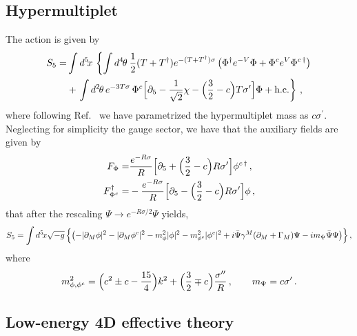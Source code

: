 \documentclass[a4paper,12pt]{article}
\begin{document}
\subsection{Hypermultiplet}

The action is given by
\begin{align}
    S_5 =& \int d^{5}\! x\, \left\{ \int d^4\mspace{-2mu}\theta \:
        \frac{1}{2} (T + T^{\dag} ) e^{-(T+ T^{\dag})\sigma}
        \,\bigl(\Phi^{\dag} e^{-V}\Phi + \Phi^{c} e^{V}\Phi^{c\,\dag}\bigr) \right.\nonumber\\
    & + \left.\int d^2\mspace{-2mu} \theta\, e^{-3 T \sigma}\, \Phi^c
        \Bigl[ \partial_{5} -\frac{1}{\sqrt{2}}\chi - \Bigl( \frac{3}{2}
        - c \Bigr) T\sigma^\prime \Bigr] \Phi + \text{h.c.}
    \right\}\, ,
\label{hyperw}
\end{align}
where following Ref.~\cite{gp} we have parametrized the hypermultiplet
mass as $c\sigma^\prime$.  
Neglecting for simplicity the gauge sector, 
we have that 
the  auxiliary fields are given by
\begin{align}
    F_{\Phi} = & \frac{e^{-R\sigma}}{R} \Bigl[\partial_{5} +
    \Bigl(\frac{3}{2} - c \Bigr)R \sigma' \Bigr] \phi^{c\, \dagger}
\, ,\nonumber\\
    F_{\Phi^c}^\dagger = & - \frac{e^{-R\sigma}}{R} \Bigl[\partial_{5} -
    \Bigl(\frac{3}{2} - c \Bigr)R \sigma' \Bigr] \phi\, ,
\end{align}
that after the rescaling $\Psi \rightarrow e^{-R\sigma/2} \Psi$ yields,
\begin{equation}
    S_5 = \int d^{5}\! x \sqrt{-g} \, \Bigl\{ \bigl( - |\partial_{M}
    \phi|^2 - |\partial_{M}  \phi^{c}|^2 - m_{\phi}^2 |\phi|^2 -
m_{\phi^c}^2     |\phi^{c}|^2  + i \bar{\Psi} \gamma^{M}(\partial_{M} +
    \Gamma_{M}) \Psi - i m_{\Psi} \bar{\Psi}\Psi \bigr)\Bigr\}\, ,
\end{equation}
where
\begin{equation}
    m^2_{\phi,\phi^c}  = \Bigl( c^2 \pm c - \frac{15}{4} \Bigr)k^2 +
    \Bigl(\frac{3}{2} \mp
    c\Bigr) \frac{\sigma''}{R}\, ,\qquad    m_{\Psi}  = c\sigma'\, .
\end{equation}







\subsection{Low-energy 4D effective theory}
\end{document}
